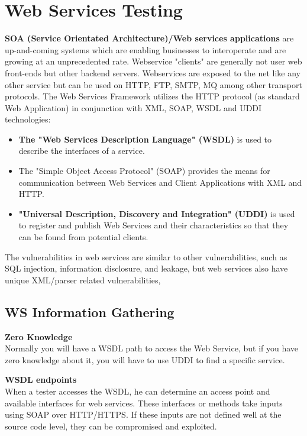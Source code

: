 \chapter{Web Services Testing}

	{\bf SOA (Service Orientated Architecture)/Web services applications} are up-and-coming systems 
	which are enabling businesses to interoperate and are growing at an unprecedented rate. 
	Webservice "clients" are generally not user web front-ends but other backend servers. 
	Webservices are exposed to the net like any other service but can be used on HTTP, FTP, SMTP, MQ
	among other transport protocols. The Web Services Framework utilizes the HTTP protocol 
	(as standard Web Application) in conjunction with XML, SOAP, WSDL and UDDI technologies:
		\begin{itemize}
			\item {\bf The "Web Services Description Language" (WSDL)} is used to describe the interfaces 
			of a service.
			\item {The "Simple Object Access Protocol" (SOAP)} provides the means for communication between 
			Web Services and Client Applications with XML and HTTP.
			\item {\bf "Universal Description, Discovery and Integration" (UDDI)} is used to register and
			publish Web Services and their characteristics so that they can be found from potential 
			clients.
		\end{itemize}

	The vulnerabilities in web services are similar to other vulnerabilities, such as SQL injection,
	information disclosure, and leakage, but web services also have unique XML/parser related 
	vulnerabilities, 

	\section{WS Information Gathering}
	{\bf Zero Knowledge} \\
	Normally you will have a WSDL path to access the Web Service, but if you have zero knowledge about it, 
	you will have to use UDDI to find a specific service. 

	{\bf WSDL endpoints} \\
	When a tester accesses the WSDL, he can determine an access point and available interfaces for web
	services. These interfaces or methods take inputs using SOAP over HTTP/HTTPS. If these inputs are 
	not defined well at the source code level, they can be compromised and exploited. 

